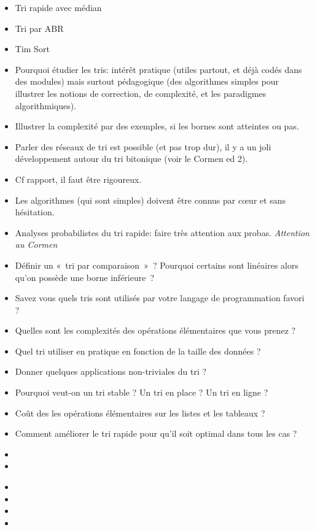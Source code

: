 \documentclass{agregfiche}
\begin{document}
\secidees

\begin{itemize}
    \item Tri rapide avec médian
    \item Tri par ABR
    \item Tim Sort
    \item Pourquoi étudier les tris: intérêt pratique (utiles partout, et déjà codés dans des modules) mais surtout pédagogique (des algorithmes simples pour illustrer les notions de correction, de complexité, et les paradigmes algorithmiques).
    \item Illustrer la complexité par des exemples, si les bornes sont atteintes ou pas.
    \item Parler des réseaux de tri est possible (et pas trop dur), il y a un joli développement autour du tri bitonique (voir le Cormen ed 2).
\end{itemize}

\secpieges

\begin{itemize}
    \item Cf rapport, il faut être rigoureux.
    \item Les algorithmes (qui sont simples) doivent être connus par c\oe ur et sans hésitation.
    \item Analyses probabilistes du tri rapide: faire très attention aux probas.
        \emph{Attention au Cormen}
\end{itemize}


\secquestionsclassiques

\begin{itemize}
    \item Définir un «~tri par comparaison~»~? Pourquoi certains sont linéaires
        alors qu'on possède une borne inférieure~?
    \item Savez vous quels tris sont utilisés par votre langage de programmation
        favori ?
    \item Quelles sont les complexités des opérations élémentaires que vous
        prenez ?
    \item Quel tri utiliser en pratique en fonction de la taille des données ?
    \item Donner quelques applications non-triviales du tri ?
    \item Pourquoi veut-on un tri stable ? Un tri en place ? Un tri en ligne ?
    \item Coût des les opérations élémentaires sur les listes et les tableaux ?
    \item Comment améliorer le tri rapide pour qu'il soit optimal dans tous les cas ?
\end{itemize}

\secreferences

\begin{itemize}
    \item 
    \item 
\end{itemize}

\secdev

\begin{itemize}
	\item 
	\item 
	\item 
	\item 
\end{itemize}
\end{document}
